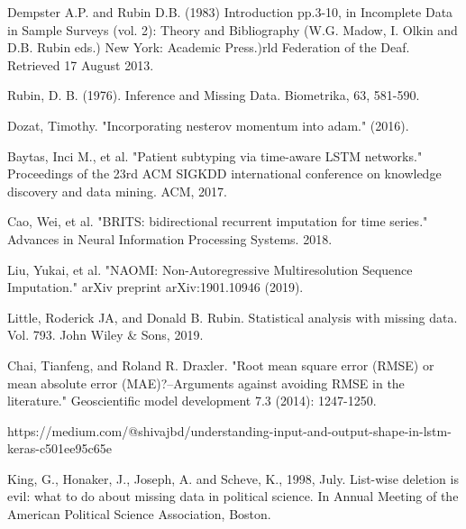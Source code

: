 \documentclass[11pt]{report}           %
\begin{document}
\appendix
%
%



\medskip



\begin{thebibliography}{80}



Dempster A.P. and Rubin D.B. (1983) Introduction pp.3-10, in Incomplete Data in Sample Surveys (vol. 2): Theory and Bibliography (W.G. Madow, I. Olkin and D.B. Rubin eds.) New York: Academic Press.)rld Federation of the Deaf. Retrieved 17 August 2013.
 
 Rubin, D. B. (1976). Inference and Missing Data. Biometrika, 63, 581-590. 

  Dozat, Timothy. "Incorporating nesterov momentum into adam." (2016).
 
 Baytas, Inci M., et al. "Patient subtyping via time-aware LSTM networks." Proceedings of the 23rd ACM SIGKDD international conference on knowledge discovery and data mining. ACM, 2017.
 
 Cao, Wei, et al. "BRITS: bidirectional recurrent imputation for time series." Advances in Neural Information Processing Systems. 2018.
 
 Liu, Yukai, et al. "NAOMI: Non-Autoregressive Multiresolution Sequence Imputation." arXiv preprint arXiv:1901.10946 (2019).
 
 Little, Roderick JA, and Donald B. Rubin. Statistical analysis with missing data. Vol. 793. John Wiley & Sons, 2019.
 
 Chai, Tianfeng, and Roland R. Draxler. "Root mean square error (RMSE) or mean absolute error (MAE)?–Arguments against avoiding RMSE in the literature." Geoscientific model development 7.3 (2014): 1247-1250.
 
 https://medium.com/@shivajbd/understanding-input-and-output-shape-in-lstm-keras-c501ee95c65e
 
 King, G., Honaker, J., Joseph, A. and Scheve, K., 1998, July. List-wise deletion is evil: what to do about missing data in political science. In Annual Meeting of the American Political Science Association, Boston.


\end{thebibliography}
\end{document}
